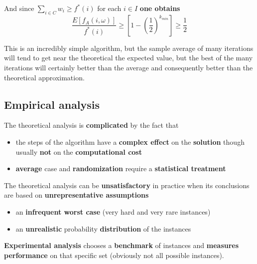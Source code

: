 And since $\sum_{i \in C} w_i \geq f^\ast (i)$ for each $i \in I$ \textbf{one obtains}
$$ \frac{E \left[f_A (i, \omega)\right]}{f^\ast (i)} \geq \left[1 - \left(\frac{1}{2}\right)^{k_{min}}\right] \geq \frac{1}{2} $$

This is an incredibly simple algorithm, but the sample average of many iterations will tend to get near the theoretical the expected value, but the best of the many iterations will certainly better than the average and consequently better than the theoretical approximation.\\


\newpage

\subsection{Empirical analysis}
The theoretical analysis is \textbf{complicated} by the fact that
\begin{itemize}
	\item the steps of the algorithm have a \textbf{complex effect} on the \textbf{solution} though usually \textbf{not} on the \textbf{computational cost}
	\item \textbf{average} case and \textbf{randomization} require a \textbf{statistical treatment}
\end{itemize}
The theoretical analysis can be \textbf{unsatisfactory} in practice when its conclusions are based on \textbf{unrepresentative assumptions}
\begin{itemize}
	\item an \textbf{infrequent worst case} (very hard and very rare instances)
	\item an \textbf{unrealistic} probability \textbf{distribution} of the instances
\end{itemize}

\textbf{Experimental analysis} chooses a \textbf{benchmark} of instances and \textbf{measures performance} on that specific set (obviously not all possible instances).\\

